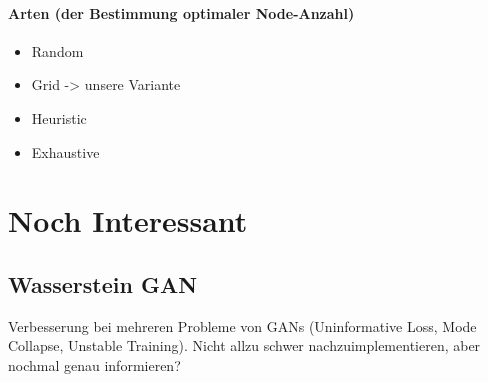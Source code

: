 \paragraph{Arten (der Bestimmung optimaler Node-Anzahl) \cite{nodes-how-to-configure, nodes-hiddenlayers-how-many}}
\begin{itemize}
	\item Random
	\item Grid -> unsere Variante
	\item Heuristic
	\item Exhaustive
\end{itemize}


\section{Noch Interessant}
\subsection{Wasserstein GAN}
Verbesserung bei mehreren Probleme von GANs (Uninformative Loss, Mode Collapse, Unstable Training).
Nicht allzu schwer nachzuimplementieren, aber nochmal genau informieren?
